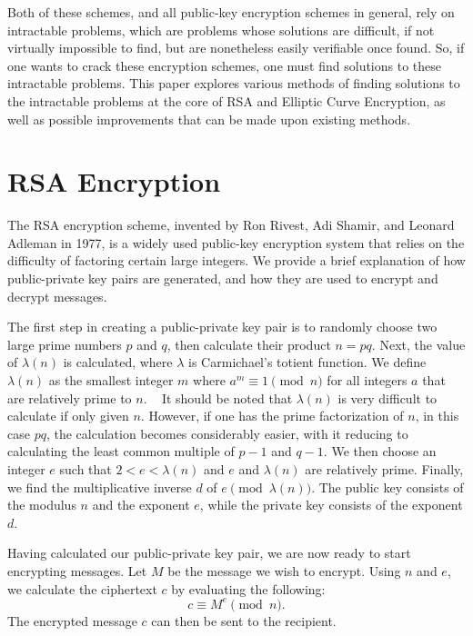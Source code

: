 \documentclass[letterpaper,twocolumn,12pt]{article}
\begin{document}
    Both of these schemes, and all public-key encryption schemes in general,
    rely on intractable problems, which are problems whose solutions are
    difficult, if not virtually impossible to find, but are nonetheless easily
    verifiable once found.
    So, if one wants to crack these encryption schemes, one must find solutions
    to these intractable problems.
    This paper explores various methods of finding solutions to the intractable
    problems at the core of RSA and Elliptic Curve Encryption, as well as
    possible improvements that can be made upon existing methods.

    \section*{RSA Encryption}

    The RSA encryption scheme, invented by Ron Rivest, Adi Shamir, and Leonard
    Adleman in 1977, is a widely used public-key encryption system that relies
    on the difficulty of factoring certain large integers. We provide a brief
    explanation of how public-private key pairs are generated, and how they
    are used to encrypt and decrypt messages.
    
    The first step in creating a public-private key pair is to randomly choose
    two large prime numbers \( p \) and \( q \), then calculate their product
    \( n = pq \). Next, the value of \( \lambda(n) \) is calculated, where
    \( \lambda \) is Carmichael's totient function.
    We define \( \lambda(n) \) as the smallest integer \( m \) where
    \( a^m \equiv 1 \pmod{n} \) for all integers \( a \) that are relatively
    prime to \( n \).
    ~\cite{WA:Carmichael}
    It should be noted that \( \lambda(n) \) is very difficult to calculate if
    only given \( n \).
    However, if one has the prime factorization of \( n \), in this case
    \( pq \), the calculation becomes considerably easier, with it reducing
    to calculating the least common multiple of \( p - 1 \) and \( q - 1\).
    We then choose an integer \( e \) such that \( 2 < e < \lambda(n) \) and
    \( e \) and \( \lambda(n) \) are relatively prime.
    Finally, we find the
    multiplicative inverse \( d \) of \( e \pmod{\lambda(n)} \).
    The public key consists of the modulus \( n \) and the exponent \( e \),
    while the private key consists of the exponent \( d \).

    Having calculated our public-private key pair, we are now ready to start
    encrypting messages.
    Let \( M \) be the message we wish to encrypt.
    Using \( n \) and \( e \), we calculate the ciphertext \( c \) by
    evaluating the following:
    \[ c \equiv M^e \pmod{n}. \]
    The encrypted message \( c \) can then be sent to the recipient.
\end{document}
